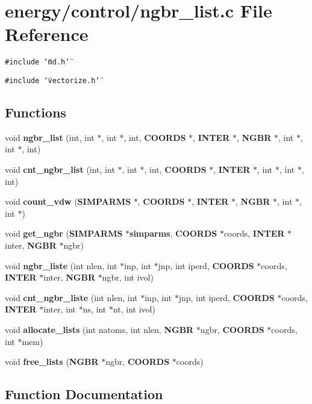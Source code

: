 \section{energy/control/ngbr\_\-list.c File Reference}
\label{ngbr__list_8c}
{\tt \#include \char`\"{}md.h\char`\"{}}\par
{\tt \#include \char`\"{}vectorize.h\char`\"{}}\par
\subsection*{Functions}
\begin{CompactItemize}
\item 
void {\bf ngbr\_\-list} (int, int $\ast$, int $\ast$, int, {\bf COORDS} $\ast$, {\bf INTER} $\ast$, {\bf NGBR} $\ast$, int $\ast$, int $\ast$, int)
\item 
void {\bf cnt\_\-ngbr\_\-list} (int, int $\ast$, int $\ast$, int, {\bf COORDS} $\ast$, {\bf INTER} $\ast$, int $\ast$, int $\ast$, int)
\item 
void {\bf count\_\-vdw} ({\bf SIMPARMS} $\ast$, {\bf COORDS} $\ast$, {\bf INTER} $\ast$, {\bf NGBR} $\ast$, int $\ast$, int $\ast$)
\item 
void {\bf get\_\-ngbr} ({\bf SIMPARMS} $\ast${\bf simparms}, {\bf COORDS} $\ast$coords, {\bf INTER} $\ast$inter, {\bf NGBR} $\ast$ngbr)
\item 
void {\bf ngbr\_\-liste} (int nlen, int $\ast$inp, int $\ast$jnp, int iperd, {\bf COORDS} $\ast$coords, {\bf INTER} $\ast$inter, {\bf NGBR} $\ast$ngbr, int ivol)
\item 
void {\bf cnt\_\-ngbr\_\-liste} (int nlen, int $\ast$inp, int $\ast$jnp, int iperd, {\bf COORDS} $\ast$coords, {\bf INTER} $\ast$inter, int $\ast$ns, int $\ast$nt, int ivol)
\item 
void {\bf allocate\_\-lists} (int natoms, int nlen, {\bf NGBR} $\ast$ngbr, {\bf COORDS} $\ast$coords, int $\ast$mem)
\item 
void {\bf free\_\-lists} ({\bf NGBR} $\ast$ngbr, {\bf COORDS} $\ast$coords)
\end{CompactItemize}


\subsection{Function Documentation}
